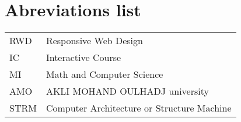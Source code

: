 \chapter*{Abreviations list}
\lhead{}

\begin{tabular}{ll}
RWD & Responsive Web Design \\
IC  & Interactive Course \\
MI  & Math and Computer Science \\
AMO & AKLI MOHAND OULHADJ university \\
STRM & Computer Architecture or Structure Machine\\
\end{tabular}